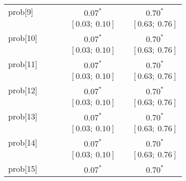 \begin{table}
\begin{center}
\begin{tabular}{l c c c c c c }
prob[9]   &                           &                           &                           & $0.07^{*}$              &                           & $0.70^{*}$            \\
          &                           &                           &                           & $[0.03;\ 0.10]$         &                           & $[0.63;\ 0.76]$       \\
prob[10]  &                           &                           &                           & $0.07^{*}$              &                           & $0.70^{*}$            \\
          &                           &                           &                           & $[0.03;\ 0.10]$         &                           & $[0.63;\ 0.76]$       \\
prob[11]  &                           &                           &                           & $0.07^{*}$              &                           & $0.70^{*}$            \\
          &                           &                           &                           & $[0.03;\ 0.10]$         &                           & $[0.63;\ 0.76]$       \\
prob[12]  &                           &                           &                           & $0.07^{*}$              &                           & $0.70^{*}$            \\
          &                           &                           &                           & $[0.03;\ 0.10]$         &                           & $[0.63;\ 0.76]$       \\
prob[13]  &                           &                           &                           & $0.07^{*}$              &                           & $0.70^{*}$            \\
          &                           &                           &                           & $[0.03;\ 0.10]$         &                           & $[0.63;\ 0.76]$       \\
prob[14]  &                           &                           &                           & $0.07^{*}$              &                           & $0.70^{*}$            \\
          &                           &                           &                           & $[0.03;\ 0.10]$         &                           & $[0.63;\ 0.76]$       \\
prob[15]  &                           &                           &                           & $0.07^{*}$              &                           & $0.70^{*}$            \\

\end{tabular}
\end{center}
\end{table}
